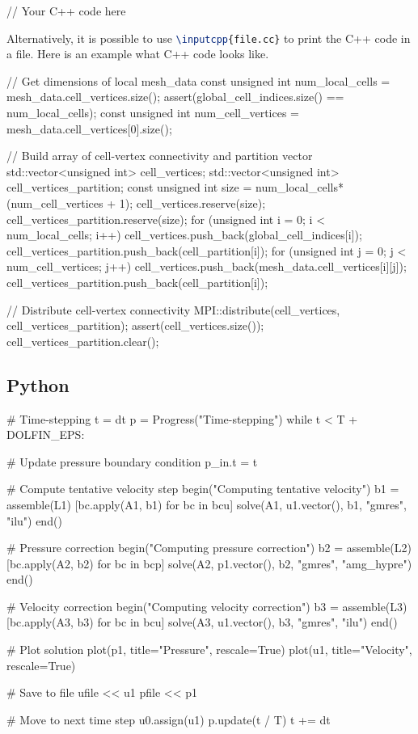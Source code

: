 \documentclass{ansarticle}
\begin{document}
\begin{latexcode}
\begin{c++}
  // Your C++ code here
\end{c++}
\end{latexcode}

Alternatively, it is possible to use \lstinline[language=TeX]!\inputcpp{file.cc}!
to print the C++ code in a file. Here is an example what C++ code
looks like.

\begin{c++}
// Get dimensions of local mesh_data
const unsigned int num_local_cells = mesh_data.cell_vertices.size();
assert(global_cell_indices.size() == num_local_cells);
const unsigned int num_cell_vertices = mesh_data.cell_vertices[0].size();

// Build array of cell-vertex connectivity and partition vector
std::vector<unsigned int> cell_vertices;
std::vector<unsigned int> cell_vertices_partition;
const unsigned int size = num_local_cells*(num_cell_vertices + 1);
cell_vertices.reserve(size);
cell_vertices_partition.reserve(size);
for (unsigned int i = 0; i < num_local_cells; i++)
{
  cell_vertices.push_back(global_cell_indices[i]);
  cell_vertices_partition.push_back(cell_partition[i]);
  for (unsigned int j = 0; j < num_cell_vertices; j++)
  {
    cell_vertices.push_back(mesh_data.cell_vertices[i][j]);
    cell_vertices_partition.push_back(cell_partition[i]);
  }
}

// Distribute cell-vertex connectivity
MPI::distribute(cell_vertices, cell_vertices_partition);
assert(cell_vertices.size());
cell_vertices_partition.clear();
\end{c++}

\subsection{Python}
\begin{python}
# Time-stepping
t = dt
p = Progress("Time-stepping")
while t < T + DOLFIN_EPS:

    # Update pressure boundary condition
    p_in.t = t

    # Compute tentative velocity step
    begin("Computing tentative velocity")
    b1 = assemble(L1)
    [bc.apply(A1, b1) for bc in bcu]
    solve(A1, u1.vector(), b1, "gmres", "ilu")
    end()

    # Pressure correction
    begin("Computing pressure correction")
    b2 = assemble(L2)
    [bc.apply(A2, b2) for bc in bcp]
    solve(A2, p1.vector(), b2, "gmres", "amg_hypre")
    end()

    # Velocity correction
    begin("Computing velocity correction")
    b3 = assemble(L3)
    [bc.apply(A3, b3) for bc in bcu]
    solve(A3, u1.vector(), b3, "gmres", "ilu")
    end()

    # Plot solution
    plot(p1, title="Pressure", rescale=True)
    plot(u1, title="Velocity", rescale=True)

    # Save to file
    ufile << u1
    pfile << p1

    # Move to next time step
    u0.assign(u1)
    p.update(t / T)
    t += dt
\end{python}



\end{document}
